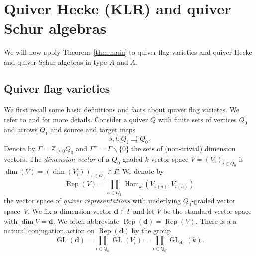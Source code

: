 \documentclass{amsart}
\theoremstyle{plain}
\theoremstyle{TheoremNum}
\theoremstyle{definition}
\theoremstyle{remark}
\numberwithin{equation}{section}
\newcommand{\Z}{\mathbb{Z}}
\newcommand{\Hom}{\operatorname{Hom}}
\newcommand{\GL}{\operatorname{GL}}
\newcommand{\Rep}{\operatorname{Rep}}
\begin{document}
\section{Quiver Hecke (KLR) and quiver Schur algebras}\label{sec:quiverheckeandquiverschur}
We will now apply Theorem~\ref{thm:main} to quiver flag varieties and quiver Hecke and quiver Schur algebras in type $A$ and $\widetilde{A}.$
\subsection{Quiver flag varieties} We first recall some basic definitions and facts about quiver flag varietes. We refer to \cite{stroppel_quiver_2014} and \cite{przezdziecki_quiver_2019} for more details.
Consider a quiver $Q$ with finite sets of vertices $Q_0$ and arrows $Q_1$ and source and target maps $$s,t:Q_1\rightrightarrows Q_0.$$
Denote by $\Gamma=\Z_{\geq 0} Q_0$ and $\Gamma^+=\Gamma\backslash \{0\}$ the sets of (non-trivial) dimension vectors. The \emph{dimension vector} of a $Q_0$-graded $k$-vector space $V=(V_i)_{i\in Q_0}$ is $\dim(V)=(\dim(V_i))_{i\in Q_0}\in \Gamma.$ 
We denote by
$$\Rep(V)=\prod_{a\in Q_1}\Hom_k(V_{s(a)},V_{t(a)})$$
the vector space of \emph{quiver representations} with underlying $Q_0$-graded vector space~$V.$
We fix a dimension vector $\mathbf{d}\in \Gamma$ and let $V$ be the standard vector space with $\dim V=\mathbf{d}.$ We often abbreviate $\Rep(\mathbf{d})=\Rep(V).$ There is a a natural conjugation action on $\Rep(\mathbf{d})$ by the group
$$\GL(\mathbf{d})=\prod_{i\in Q_0}\GL(V_i)=\prod_{i\in Q_0}\GL_{\mathbf{d}_i}(k).$$
\end{document}
